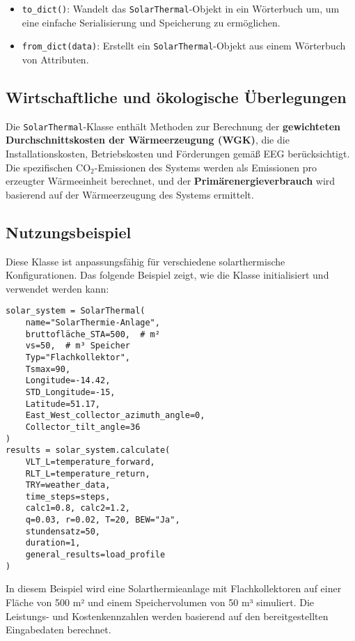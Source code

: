 \begin{itemize}
    \item \texttt{to\_dict()}: Wandelt das \texttt{SolarThermal}-Objekt in ein Wörterbuch um, um eine einfache Serialisierung und Speicherung zu ermöglichen.
    
    \item \texttt{from\_dict(data)}: Erstellt ein \texttt{SolarThermal}-Objekt aus einem Wörterbuch von Attributen.
\end{itemize}

\subsection{Wirtschaftliche und ökologische Überlegungen}
Die \texttt{SolarThermal}-Klasse enthält Methoden zur Berechnung der \textbf{gewichteten Durchschnittskosten der Wärmeerzeugung (WGK)}, die die Installationskosten, Betriebskosten und Förderungen gemäß EEG berücksichtigt. Die spezifischen CO$_2$-Emissionen des Systems werden als Emissionen pro erzeugter Wärmeeinheit berechnet, und der \textbf{Primärenergieverbrauch} wird basierend auf der Wärmeerzeugung des Systems ermittelt.

\subsection{Nutzungsbeispiel}
Diese Klasse ist anpassungsfähig für verschiedene solarthermische Konfigurationen. Das folgende Beispiel zeigt, wie die Klasse initialisiert und verwendet werden kann:

\begin{verbatim}
solar_system = SolarThermal(
    name="SolarThermie-Anlage",
    bruttofläche_STA=500,  # m²
    vs=50,  # m³ Speicher
    Typ="Flachkollektor",
    Tsmax=90, 
    Longitude=-14.42, 
    STD_Longitude=-15, 
    Latitude=51.17, 
    East_West_collector_azimuth_angle=0, 
    Collector_tilt_angle=36
)
results = solar_system.calculate(
    VLT_L=temperature_forward, 
    RLT_L=temperature_return, 
    TRY=weather_data, 
    time_steps=steps, 
    calc1=0.8, calc2=1.2, 
    q=0.03, r=0.02, T=20, BEW="Ja", 
    stundensatz=50, 
    duration=1, 
    general_results=load_profile
)
\end{verbatim}
In diesem Beispiel wird eine Solarthermieanlage mit Flachkollektoren auf einer Fläche von 500 m² und einem Speichervolumen von 50 m³ simuliert. Die Leistungs- und Kostenkennzahlen werden basierend auf den bereitgestellten Eingabedaten berechnet.

%